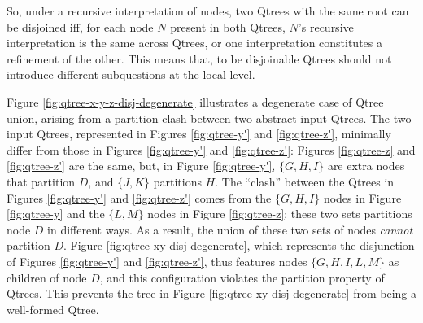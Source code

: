 So, under a recursive interpretation of nodes, two Qtrees with the same root can be disjoined iff, for each node $N$ present in both Qtrees, $N$'s recursive interpretation is the same across Qtrees, or one interpretation constitutes a refinement of the other. This means that, to be disjoinable Qtrees should not introduce different subquestions at the local level.

Figure \ref{fig:qtree-x-y-z-disj-degenerate} illustrates a degenerate case of Qtree union, arising from a partition clash between two abstract input Qtrees. The two input Qtrees, represented in Figures \ref{fig:qtree-y'} and \ref{fig:qtree-z'}, minimally differ from those in Figures \ref{fig:qtree-y'} and \ref{fig:qtree-z'}: Figures \ref{fig:qtree-z} and \ref{fig:qtree-z'} are the same, but, in Figure \ref{fig:qtree-y'}, $\lbrace G, H, I \rbrace$ are extra nodes that partition $D$, and $\lbrace J, K \rbrace$ partitions $H$. The ``clash'' between the Qtrees in Figures \ref{fig:qtree-y'} and \ref{fig:qtree-z'} comes from the $\lbrace G, H, I \rbrace$ nodes in Figure \ref{fig:qtree-y} and the $\lbrace L, M \rbrace$ nodes in Figure \ref{fig:qtree-z}: these two sets partitions node $D$ in different ways. As a result, the union of these two sets of nodes \textit{cannot} partition $D$. Figure \ref{fig:qtree-xy-disj-degenerate}, which represents the disjunction of Figures \ref{fig:qtree-y'} and \ref{fig:qtree-z'}, thus features nodes $\lbrace G, H, I, L, M \rbrace$ as children of node $D$, and this configuration violates the partition property of Qtrees. This prevents the tree in Figure \ref{fig:qtree-xy-disj-degenerate} from being a well-formed Qtree. 

